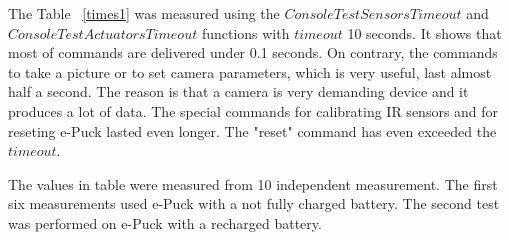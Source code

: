   The Table ~\ref{times1}  was measured using the $ConsoleTestSensorsTimeout$ and
  $ConsoleTestActuatorsTimeout$ functions with $timeout$ 10 seconds.
  It shows that most of commands are delivered under 0.1 seconds. 
  On contrary, the commands to take a picture or to set camera parameters, 
  which is very useful, last almost half a second. 
  The reason is that a camera is very demanding device and it produces a lot of data.
  The special commands for calibrating IR sensors and for reseting e-Puck lasted even longer.
  The "reset" command has even exceeded the $timeout$.

  The values in table were measured from 10 independent measurement. 
  The first six measurements used e-Puck with a not fully charged battery.
  The second test was performed on e-Puck with a recharged battery.


